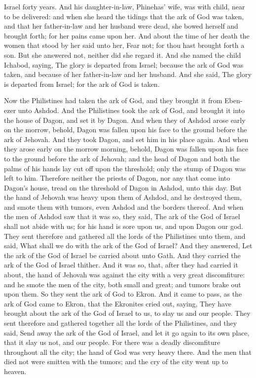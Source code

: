 Israel forty years.  And his daughter-in-law, Phinehas’ wife, was with child, near to be delivered: and when she heard the tidings that the ark of God was taken, and that her father-in-law and her husband were dead, she bowed herself and brought forth; for her pains came upon her. And about the time of her death the women that stood by her said unto her, Fear not; for thou hast brought forth a son. But she answered not, neither did she regard it. And she named the child Ichabod, saying, The glory is departed from Israel; because the ark of God was taken, and because of her father-in-law and her husband. And she said, The glory is departed from Israel; for the ark of God is taken. 

Now the Philistines had taken the ark of God, and they brought it from Eben-ezer unto Ashdod. And the Philistines took the ark of God, and brought it into the house of Dagon, and set it by Dagon. And when they of Ashdod arose early on the morrow, behold, Dagon was fallen upon his face to the ground before the ark of Jehovah. And they took Dagon, and set him in his place again. And when they arose early on the morrow morning, behold, Dagon was fallen upon his face to the ground before the ark of Jehovah; and the head of Dagon and both the palms of his hands lay cut off upon the threshold; only the stump of Dagon was left to him. Therefore neither the priests of Dagon, nor any that come into Dagon’s house, tread on the threshold of Dagon in Ashdod, unto this day.  But the hand of Jehovah was heavy upon them of Ashdod, and he destroyed them, and smote them with tumors, even Ashdod and the borders thereof. And when the men of Ashdod saw that it was so, they said, The ark of the God of Israel shall not abide with us; for his hand is sore upon us, and upon Dagon our god. They sent therefore and gathered all the lords of the Philistines unto them, and said, What shall we do with the ark of the God of Israel? And they answered, Let the ark of the God of Israel be carried about unto Gath. And they carried the ark of the God of Israel thither. And it was so, that, after they had carried it about, the hand of Jehovah was against the city with a very great discomfiture: and he smote the men of the city, both small and great; and tumors brake out upon them. So they sent the ark of God to Ekron. And it came to pass, as the ark of God came to Ekron, that the Ekronites cried out, saying, They have brought about the ark of the God of Israel to us, to slay us and our people. They sent therefore and gathered together all the lords of the Philistines, and they said, Send away the ark of the God of Israel, and let it go again to its own place, that it slay us not, and our people. For there was a deadly discomfiture throughout all the city; the hand of God was very heavy there. And the men that died not were smitten with the tumors; and the cry of the city went up to heaven. 

